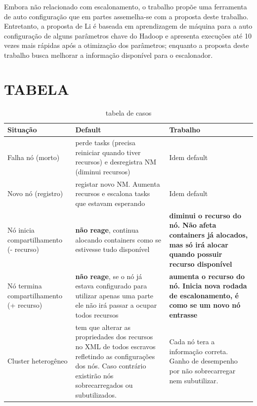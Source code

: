 Embora não relacionado com escalonamento, o trabalho \cite{Li} propõe uma ferramenta de auto configuração que em partes assemelha-se com a proposta deste trabalho. Entretanto, a proposta de Li é baseada em aprendizagem de máquina para a auto configuração de alguns parâmetros chave do Hadoop e apresenta execuções até 10 vezes mais rápidas após a otimização dos parâmetros; enquanto a proposta deste trabalho busca melhorar a informação disponível para o escalonador.
\newpage

\section{TABELA}
\begin{table}[!h]
	\centering
	\begin{tabular}{|p{3.0cm}|p{6.0cm}|p{6.0cm}|}
		\hline
		Situação & Default & Trabalho \\
		\hline
		Falha nó (morto) & perde tasks (precisa reiniciar quando tiver recursos) e desregistra NM (diminui recursos) & Idem default\\
		\hline
		Novo nó (registro) & registar novo NM. Aumenta recursos e escalona tasks que estavam esperando & Idem default\\
		\hline
		Nó inicia compartilhamento (- recurso) & \textbf{não reage}, continua alocando containers como se estivesse tudo disponível & \textbf{diminui o recurso do nó. Não afeta containers já alocados, mas só irá alocar quando possuir recurso disponível}\\
		\hline
		Nó termina compartilhamento (+ recurso) &\textbf{não reage}, se o nó já estava configurado para utilizar apenas uma parte ele não irá passar a ocupar todos recursos & \textbf{aumenta o recurso do nó. Inicia nova rodada de escalonamento, é como se um novo nó entrasse}\\
		\hline
		Cluster heterogêneo & tem que alterar as propriedades dos recursos no XML de todos escravos refletindo as configurações dos nós. Caso contrário existirão nós sobrecarregados ou subutilizados. & Cada nó tera a informação correta. Ganho de desempenho por não sobrecarregar nem subutilizar.\\
		\hline
		
	\end{tabular}
	\caption{tabela de casos}
	\label{tab:memory allocation}
\end{table}

